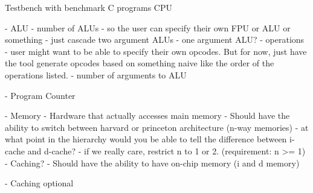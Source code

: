 Testbench with benchmark C programs
CPU

- ALU
	- number of ALUs
		- so the user can specify their own FPU or ALU or something
		- just cascade two argument ALUs
		- one argument ALU?
	- operations
		- user might want to be able to specify their own opcodes. But for now, just have the tool generate opcodes based on something naive like the order of the operations listed.
	- number of arguments to ALU

- Program Counter

- Memory
	- Hardware that actually accesses main memory
	- Should have the ability to switch between harvard or princeton architecture (n-way memories)
		- at what point in the hierarchy would you be able to tell the difference between i-cache and d-cache?
		- if we really care, restrict n to 1 or 2. (requirement: n >= 1)
	- Caching?
	- Should have the ability to have on-chip memory (i and d memory)

- Caching optional
